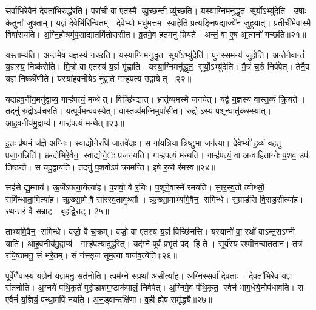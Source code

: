 सर्वा॑भिरे॒वैनं॑ दे॒वता॑भि॒रुद्ध॑रति। परा॑ची॒ वा ए॒तस्मै व्यु॒च्छन्ती॒ व्यु॑च्छति। यस्या॒ग्निमनु॑द्धृत॒ सूर्यो॒ऽभ्यु॑देति॑। उ॒षाः के॒तुना॑ जुषताम्। य॒ज्ञं दे॒वेभि॑रिन्वि॒तम्। दे॒वेभ्यो॒ मधु॑मत्तम॒ स्वाहेति॑ प्र॒त्यङ्नि॒षद्याज्ये॑न जुहुयात्। प्र॒तीची॑मे॒वास्मै॒ विवा॑सयति। अ॒ग्नि॒हो॒त्रमु॑प॒साद्यातमि॑तोरासीत। व्र॒तमे॒व ह॒तमनु॑ म्रियते। अन्तं॒ वा ए॒ष आ॒त्मनो॑ गच्छति॥२१॥

यस्ताम्य॑ति। अन्त॑मे॒ष य॒ज्ञस्य॑ गच्छति। यस्या॒ग्निमनु॑द्धृत॒ सूर्यो॒ऽभ्यु॑देति॑। पुन॑स्स॒मन्य॑ जुहोति। अन्ते॑नै॒वान्तं॑ य॒ज्ञस्य॒ निष्क॑रोति। मि॒त्रो वा ए॒तस्य॑ य॒ज्ञं गृ॑ह्णाति। यस्या॒ग्निमनु॑द्धृत॒ सूर्यो॒ऽभ्यु॑देति॑। मै॒त्रं च॒रुं निर्व॑पेत्। तेनै॒व य॒ज्ञं निष्क्री॑णीते। यस्या॑हव॒नीयेऽ नु॑द्वाते॒ गाऱ्ह॑पत्य उ॒द्वायेत् ॥२२॥

यदा॑हव॒नीय॒मनु॑द्वाप्य॒ गाऱ्ह॑पत्यं॒ मन्थेत्। विच्छि॑न्द्यात्। भ्रातृ॑व्यमस्मै जनयेत्। यद्वै य॒ज्ञस्य॑ वास्त॒व्यं॑ क्रि॒यते। तदनु॑ रु॒द्रोऽव॑चरति। यत्पूर्व॑मन्वव॒स्येत्। वा॒स्त॒व्य॑म॒ग्निमुपा॑सीत। रु॒द्रोऽस्य प॒शून्घातु॑कस्स्यात्। आ॒ह॒व॒नीय॑मु॒द्वाप्य॑। गाऱ्ह॑पत्यं मन्थेत्॥२३॥

इ॒तः प्र॑थ॒मं ज॑ज्ञे अ॒ग्निः। स्वाद्योने॒रधि॑ जा॒तवे॑दाः। स गा॑यत्रि॒या त्रि॒ष्टुभा॒ जग॑त्या। दे॒वेभ्यो॑ ह॒व्यं व॑हतु प्रजा॒नन्निति॑। छन्दो॑भिरे॒वैन॒ स्वाद्योने॒ः प्रज॑नयति। गाऱ्ह॑पत्यं मन्थति। गाऱ्ह॑पत्यं॒ वा अन्वाहि॑ताग्नेः प॒शव॒ उप॑ तिष्ठन्ते। स यदु॒द्वाय॑ति। तदनु॑ प॒शवोऽप॑ क्रामन्ति। इ॒षे र॒य्यै र॑मस्व॥२४॥

सह॑से द्यु॒म्नाय॑। ऊ॒र्जेऽपत्या॒येत्या॑ह। प॒शवो॒ वै र॒यिः। प॒शूने॒वास्मै॑ रमयति। सा॒र॒स्व॒तौ त्वोथ्सौ॒ समि॑न्धाता॒मित्या॑ह। ऋ॒ख्सा॒मे वै सा॑रस्व॒तावुथ्सौ। ऋ॒ख्सा॒माभ्या॑मे॒वैन॒ समि॑न्धे। स॒म्राड॑सि वि॒राड॒सीत्या॑ह। र॒थ॒न्त॒रं वै स॒म्राट्। बृ॒हद्वि॒राट्। 2५॥

ताभ्या॑मे॒वैन॒ समि॑न्धे। वज्रो॒ वै च॒क्रम्। वज्रो॒ वा ए॒तस्य॑ य॒ज्ञं विच्छि॑नत्ति। यस्यानो॑ वा॒ रथो॑ वाऽन्त॒राऽग्नी याति॑। आ॒ह॒व॒नीय॑मु॒द्वाप्य॑। गाऱ्ह॑पत्या॒दुद्ध॑रेत्। यद॑ग्ने॒ पूर्वं॒ प्रभृ॑तं प॒द हि ते। सूर्य॑स्य र॒श्मीनन्वा॑त॒तान॑। तत्र॑ रयि॒ष्ठामनु॒ सं भ॑रै॒तम्। सं न॑स्सृज सुम॒त्या वाज॑व॒त्येति॑॥२६॥

पूर्वे॑णै॒वास्य॑ य॒ज्ञेन॑ य॒ज्ञमनु॒ संत॑नोति। त्वम॑ग्ने स॒प्रथा॑ अ॒सीत्या॑ह। अ॒ग्निस्सर्वा॑ दे॒वताः। दे॒वता॑भिरे॒व य॒ज्ञ संत॑नोति। अ॒ग्नये॑ पथि॒कृते॑ पुरो॒डाश॑म॒ष्टाक॑पालं॒ निर्व॑पेत्। अ॒ग्निमे॒व प॑थि॒कृत॒ स्वेन॑ भाग॒धेये॒नोप॑धावति। स ए॒वैनं॑ य॒ज्ञियं॒ पन्था॒मपि॑ नयति। अ॒न॒ड्वान्दक्षि॑णा। व॒ही ह्ये॑ष समृ॑द्ध्यै॥२७॥


